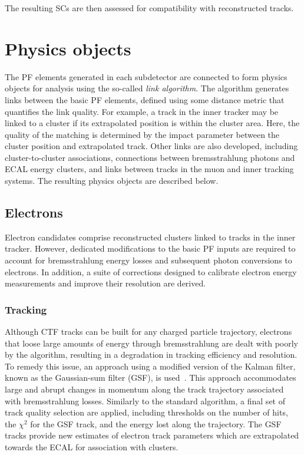 \noindent The resulting SCs are then assessed for compatibility with reconstructed tracks.


\section{Physics objects}


The PF elements generated in each subdetector are connected to form physics objects for analysis using the so-called \textit{link algorithm}. The algorithm generates links between the basic PF elements, defined using some distance metric that quantifies the link quality. For example, a track in the inner tracker may be linked to a cluster if its extrapolated position is within the cluster area. Here, the quality of the matching is determined by the impact parameter between the cluster position and extrapolated track. Other links are also developed, including cluster-to-cluster associations, connections between bremsstrahlung photons and ECAL energy clusters, and links between tracks in the muon and inner tracking systems. The resulting physics objects are described below. %

\subsection{Electrons}
\label{subsec:elec_reco}

Electron candidates comprise reconstructed clusters linked to tracks in the inner tracker. However, dedicated modifications to the basic PF inputs are required to account for bremsstrahlung energy losses and subsequent photon conversions to electrons. In addition, a suite of corrections designed to calibrate electron energy measurements and improve their resolution are derived.

\subsubsection{Tracking}

Although CTF tracks can be built for any charged particle trajectory, electrons that loose large amounts of energy through bremsstrahlung are dealt with poorly by the algorithm, resulting in a degradation in tracking efficiency and resolution. To remedy this issue, an approach using a modified version of the Kalman filter, known as the Gaussian-sum filter (GSF), is used~\cite{GSF}. This approach accommodates large and abrupt changes in momentum along the track trajectory associated with bremsstrahlung losses. Similarly to the standard algorithm, a final set of track quality selection are applied, including thresholds on the number of hits, the $\chi^{2}$ for the GSF track, and the energy lost along the trajectory. The GSF tracks provide new estimates of electron track parameters which are extrapolated towards the ECAL for association with clusters.

